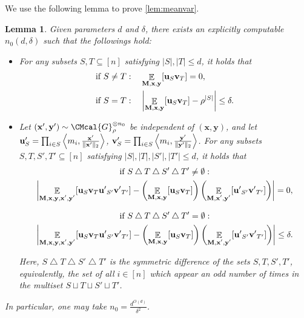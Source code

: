 \documentclass[10pt,a4paper]{article}
\def\G{\CMcal{G}}
\theoremstyle{plain}
\newtheorem{lemma}[theorem]{Lemma}
\theoremstyle{definition}
\newcommand {\minusspace} {\: \! \!}
\newcommand {\Fn} [2] {\ensuremath{ #1 \minusspace \Br{ #2 } }}
\newcommand {\innerproduct} [2] {\ensuremath{\left \langle #1 , #2 \right \rangle}}
\newcommand {\br} [1] {\ensuremath{ \left( #1 \right) }}
\newcommand {\Br} [1] {\ensuremath{ \left[ #1 \right] }}
\DeclarePairedDelimiter{\norm}{\lVert}{\rVert}
\newcommand {\normsub} [2] {\ensuremath{ \norm{#1}_{#2} }}
\newcommand {\twonorm} [1] {\normsub{#1}{2}}
\newcommand {\ab} [1] {\ensuremath{ \left| #1 \right| }}
\DeclareMathOperator*{\bigE}{\mathbb{E}}
\newcommand {\expec} [2] {\Fn{\bigE_{\substack{#1}}}{#2}}
\newcommand{\randx}{\ensuremath{\mathbf{x}}}
\newcommand{\randy}{\ensuremath{\mathbf{y}}}
\newcommand{\randu}{\ensuremath{\mathbf{u}}}
\newcommand{\randv}{\ensuremath{\mathbf{v}}}
\newcommand{\1}{\mathbb{1}} %
\begin{document}
We use the following lemma to prove \cref{lem:meanvar}.
\begin{lemma}\cite[Lemma A.8,A.9]{Ghazi:2018:DRP:3235586.3235614}\label{lem:intermediate}
Given parameters $d$ and $\delta$, there exists an explicitly computable $n_0(d,\delta)$ such that the followings hold: 
\begin{itemize}
\item For any subsets $S,T\subseteq[n]$ satisfying $\ab{S},\ab{T}\leq d$, it holds that
\begin{align*}
&\text{if }S\ne T:\quad\expec{\mathbf{M},\mathbf{x},\mathbf{y}}{\mathbf\randu_S\mathbf\randv_T}=0,\\
&\text{if }S= T:\quad\ab{\expec{\mathbf{M},\mathbf{x},\mathbf{y}}{\mathbf\randu_S\mathbf\randv_T}-\rho^{\ab{S}}}\leq\delta.\\
\end{align*}

\item Let $(\randx',\randy')\sim\G_\rho^{\otimes n_0}$ be independent of $(\randx,\randy)$, and let $\mathbf\randu'_S=\prod_{i\in S}\innerproduct{m_i}{\frac{\randx'}{\twonorm{\randx'}}}$, $\mathbf\randv'_S=\prod_{i\in S}\innerproduct{m_i}{\frac{\randy'}{\twonorm{\randy'}}}$. For any subsets $S,T,S',T'\subseteq[n]$ satisfying $\ab{S},\ab{T},\ab{S'},\ab{T'}\leq d$, it holds that
\begin{multline*}
\text{if } S\bigtriangleup T\bigtriangleup S'\bigtriangleup T'\ne\emptyset:\\\ab{\expec{\mathbf{M},\mathbf{x},\mathbf{y},\mathbf{x'},\mathbf{y'}}{\mathbf\randu_S\mathbf\randv_T\mathbf{u'}_{S'}\mathbf{v'}_{T'}}-\br{\expec{\mathbf{M},\mathbf{x},\mathbf{y}}{\mathbf\randu_S\mathbf\randv_T}}\br{\expec{\mathbf{M},\mathbf{x'},\mathbf{y'}}{\mathbf{u'}_{S'}\mathbf{v'}_{T'}}}}=0,
\end{multline*}

\begin{multline*}
\text{if } S\bigtriangleup T\bigtriangleup S'\bigtriangleup T'=\emptyset:\\\ab{\expec{\mathbf{M},\mathbf{x},\mathbf{y},\mathbf{x'},\mathbf{y'}}{\mathbf\randu_S\mathbf\randv_T\mathbf{u'}_{S'}\mathbf{v'}_{T'}}-\br{\expec{\mathbf{M},\mathbf{x},\mathbf{y}}{\mathbf\randu_S\mathbf\randv_T}}\br{\expec{\mathbf{M},\mathbf{x'},\mathbf{y'}}{\mathbf{u'}_{S'}\mathbf{v'}_{T'}}}}\leq\delta.
\end{multline*}


Here, $S\bigtriangleup T\bigtriangleup S'\bigtriangleup T'$ is the symmetric difference of the sets $S,T,S',T'$, equivalently, the set of all $i\in[n]$ which appear an odd number of times in the multiset $S\sqcup T\sqcup S'\sqcup T'$.
\end{itemize}

In particular, one may take $n_0=\frac{d^{O(d)}}{\delta^2}$.
\end{lemma}
\end{document}
